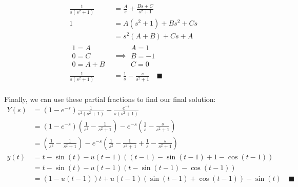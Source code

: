 \documentclass[letterpaper, fontsize=11pt]{scrartcl} %
\numberwithin{equation}{section} %
\numberwithin{figure}{section} %
\numberwithin{table}{section} %
\begin{document}
\begin{enumerate}
\begin{enumerate}
\begin{align*}
\frac{1}{s(s^2 + 1)} &= \frac{A}{s} + \frac{Bs + C}{s^2 + 1}\\
1&= A(s^2 + 1) + Bs^2 + Cs\\
&= s^2(A + B) + Cs + A\\
\begin{array}{c}
1 = A \\
0 = C \\
0 =A + B
\end{array}
&\implies
\begin{array}{c}
A = 1 \\
B = -1 \\
C = 0 
\end{array} \\
\frac{1}{s(s^2 + 1)} &= \frac{1}{s} - \frac{s}{s^2 + 1}\quad\blacksquare\\
\end{align*}

Finally, we can use these partial fractions to find our final solution:
\begin{align*}
Y(s) &= \left(1 - e^{-s} \right)\frac{1}{s^2(s^2 + 1)} - \frac{e^{-s}}{s(s^2 + 1)}\\
&= \left(1 - e^{-s} \right)\left(\frac{1}{s^2} - \frac{1}{s^2 + 1} \right) - e^{-s}\left(\frac{1}{s} - \frac{s}{s^2 + 1}\right)\\
&= \left(\frac{1}{s^2} - \frac{1}{s^2 + 1} \right) - e^{-s}\left(\frac{1}{s^2} - \frac{1}{s^2 + 1} + \frac{1}{s} - \frac{s}{s^2 + 1}\right)\\
y(t) &= t - \sin(t) - u(t-1)\left( (t-1) - \sin(t-1) + 1 - \cos(t-1)\right)\\
 &= t - \sin(t) - u(t-1)\left( t - \sin(t-1) - \cos(t-1)\right)\\
 &= (1-u(t-1))t + u(t-1)(\sin(t-1) + \cos(t-1)) - \sin(t) \quad \blacksquare
\end{align*}

\end{enumerate}


\end{enumerate}

\end{document}
